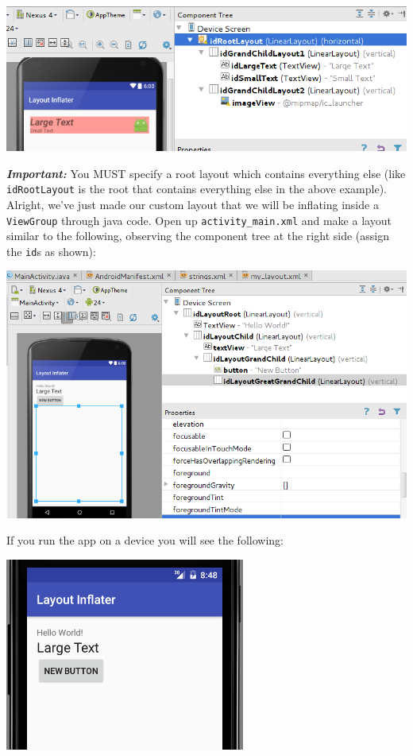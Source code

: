 \begin{center}
	\includegraphics[scale=0.4]{chapters/ch06/images/31}
\end{center}

\textbf{\textit{Important:}} You MUST specify a root layout which contains everything else (like \texttt{idRootLayout} is the root that contains everything else in the above example). \\

Alright, we've just made our custom layout that we will be inflating inside a \texttt{ViewGroup} through java code. Open up \texttt{activity\_main.xml} and make a layout similar to the following, observing the component tree at the right side (assign the \texttt{id}s as shown):

\begin{center}
	\includegraphics[scale=0.4]{chapters/ch06/images/32}
\end{center}

If you run the app on a device you will see the following:

\begin{center}
	\includegraphics[scale=0.4]{chapters/ch06/images/33}
\end{center}


